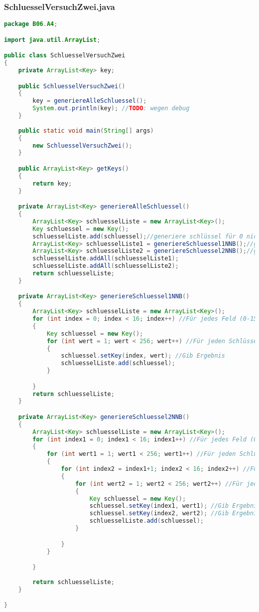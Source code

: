 \documentclass[twoside]{article}
\begin{document}
		\subsubsection*{SchluesselVersuchZwei.java}
		\begin{lstlisting}[language=Java]
package B06.A4;

import java.util.ArrayList;

public class SchluesselVersuchZwei
{
    private ArrayList<Key> key;

    public SchluesselVersuchZwei()
    {
        key = generiereAlleSchluessel();
        System.out.println(key); //TODO: wegen debug
    }
    
    public static void main(String[] args)
    {
        new SchluesselVersuchZwei();
    }

    public ArrayList<Key> getKeys()
    {
        return key;
    }

    private ArrayList<Key> generiereAlleSchluessel()
    {
        ArrayList<Key> schluesselListe = new ArrayList<Key>();
        Key schluessel = new Key();
        schluesselListe.add(schluessel);//generiere schlüssel für 0 nichtNullBytes
        ArrayList<Key> schluesselListe1 = generiereSchluessel1NNB();//generiere schlüssel für 1 nichtNullByte
        ArrayList<Key> schluesselListe2 = generiereSchluessel2NNB();//generiere schlüssel für 2 nichtNullBytes
        schluesselListe.addAll(schluesselListe1);
        schluesselListe.addAll(schluesselListe2);
        return schluesselListe;
    }

    private ArrayList<Key> generiereSchluessel1NNB()
    {
        ArrayList<Key> schluesselListe = new ArrayList<Key>();
        for (int index = 0; index < 16; index++) //Für jedes Feld (0-15)
        {
            Key schluessel = new Key();
            for (int wert = 1; wert < 256; wert++) //Für jeden Schlüsselwert (0x00 - 0xff)
            {
                schluessel.setKey(index, wert); //Gib Ergebnis
                schluesselListe.add(schluessel);
            }

        }
        return schluesselListe;
    }

    private ArrayList<Key> generiereSchluessel2NNB()
    {
        ArrayList<Key> schluesselListe = new ArrayList<Key>();
        for (int index1 = 0; index1 < 16; index1++) //Für jedes Feld (0-14)
        {
            for (int wert1 = 1; wert1 < 256; wert1++) //Für jeden Schlüsselwert (0x00 - 0xff)
            {
                for (int index2 = index1+1; index2 < 16; index2++) //Für jedes Feld (0-15)
                {
                    for (int wert2 = 1; wert2 < 256; wert2++) //Für jeden Schlüsselwert (0x00 - 0xff)
                    {
                        Key schluessel = new Key();
                        schluessel.setKey(index1, wert1); //Gib Ergebnis
                        schluessel.setKey(index2, wert2); //Gib Ergebnis
                        schluesselListe.add(schluessel);
                    }

                }
            }

        }
        
        return schluesselListe;
    }

}
		\end{lstlisting}
\end{document}
